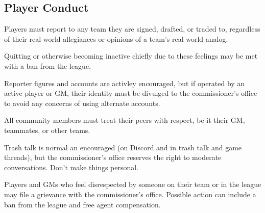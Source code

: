 \subsection{Player Conduct}
\begin{deepEnumerate}
	\item Players must report to any team they are signed, drafted, or traded to,
	regardless of their real-world allegiances or opinions of a team's real-world analog.
	\begin{deepEnumerate}
		\item Quitting or otherwise becoming inactive 
		chiefly due to these feelings
		may be met with a ban from the league.
	\end{deepEnumerate}
	\item Reporter figures and accounts are activley encouraged,
	\label{sec:reporters}
	but if operated by an active player or GM,
	their identity must be divulged to the commissioner’s office
	to avoid any concerns of using alternate accounts.
	\item All community members must treat their peers with respect,
	be it their GM, teammates, or other teams.
	\begin{deepEnumerate}
		\item Trash talk is normal an encouraged
		(on Discord and in trash talk and game threads),
		but the commissioner’s office reserves the right to moderate conversations.
		Don't make things personal.
		\item Players and GMs who feel disrespected by someone on their team or in the league 
		may file a grievance with the commissioner’s office.
		Possible action can include a ban from the league and free agent compensation.
	\end{deepEnumerate}
\end{deepEnumerate}
